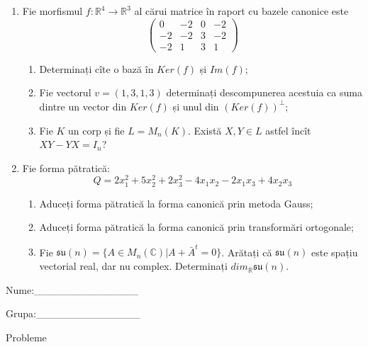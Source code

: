 \documentclass{article}
\begin{document}
\begin{enumerate}
 \item Fie morfismul $f:\mathbb{R}^4 \to \mathbb{R}^3$ al cărui matrice în raport cu bazele canonice este
$$\begin{pmatrix}
0&-2&0&-2\\
-2&-2&3&-2\\
-2&1&3&1
\end{pmatrix}$$

\begin{enumerate}
\item Determinați cîte o bază în $Ker(f)$ și $Im(f)$;
\item Fie vectorul $v=(1,3,1,3)$ determinați descompunerea acestuia ca suma dintre un vector din $Ker(f)$ și unul din $(Ker(f))^\perp$;
\item Fie $K$ un corp și fie $L=M_n(K)$. Există $X,Y \in L$ astfel încît $XY-YX=I_n$?  
\end{enumerate}
\item Fie forma pătratică:
$$Q= 2x_1^2+5x_2^2+2x_3^2-4x_1x_2-2x_1x_3+4x_2x_3$$

\begin{enumerate}
\item Aduceți forma pătratică la forma canonică prin metoda Gauss;
\item Aduceți forma pătratică la forma canonică prin transformări ortogonale;
\item Fie $\mathfrak{su}(n)=\{ A \in M_n(\mathbb{C}) | A+\bar{A}^t=0\}$. Arătați că $\mathfrak{su}(n)$ este spațiu vectorial real, dar nu complex.
Determinați $dim_{\mathbb{R}}\mathfrak{su}(n)$.
\end{enumerate}
\end{enumerate}
\newpage
\begin{flushright}
Nume:\_\_\_\_\_\_\_\_\_\_\_\_\_\_
 
 
Grupa:\_\_\_\_\_\_\_\_\_\_\_\_\_\_
\end{flushright}
\begin{center}
\vspace{2cm}
{\Large Probleme}
\vspace{2cm}
\end{center}
\end{document}
